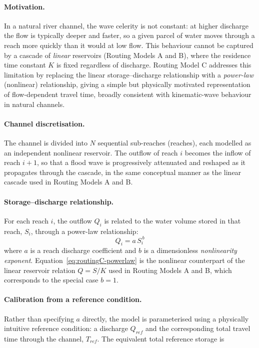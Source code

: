 \documentclass[a4paper, 12pt]{report}
\begin{document}
	\paragraph{Motivation.}
	In a natural river channel, the wave celerity is not constant: at higher discharge the flow is
	typically deeper and faster, so a given parcel of water moves through a reach more quickly than
	it would at low flow. This behaviour cannot be captured by a cascade of \emph{linear} reservoirs
	(Routing Models A and B), where the residence time constant $K$ is fixed regardless of discharge.
	Routing Model C addresses this limitation by replacing the linear storage--discharge relationship
	with a \emph{power-law} (nonlinear) relationship, giving a simple but physically motivated
	representation of flow-dependent travel time, broadly consistent with kinematic-wave behaviour in
	natural channels.

	\paragraph{Channel discretisation.}
	The channel is divided into $N$ sequential sub-reaches (reaches), each modelled as an independent
	nonlinear reservoir. The outflow of reach $i$ becomes the inflow of reach $i+1$, so that a flood
	wave is progressively attenuated and reshaped as it propagates through the cascade, in the same
	conceptual manner as the linear cascade used in Routing Models A and B.

	\paragraph{Storage--discharge relationship.}
	For each reach $i$, the outflow $Q_i$ is related to the water volume stored in that reach,
	$S_i$, through a power-law relationship:
	\begin{equation}
		Q_i = a \, S_i^{\,b}
		\label{eq:routingC-powerlaw}
	\end{equation}
	where $a$ is a reach discharge coefficient and $b$ is a dimensionless \emph{nonlinearity
	exponent}. Equation~\eqref{eq:routingC-powerlaw} is the nonlinear counterpart of the linear
	reservoir relation $Q = S/K$ used in Routing Models A and B, which corresponds to the special
	case $b=1$.

	\paragraph{Calibration from a reference condition.}
	Rather than specifying $a$ directly, the model is parameterised using a physically intuitive
	reference condition: a discharge $Q_{ref}$ and the corresponding total travel time through the
	channel, $T_{ref}$. The equivalent total reference storage is
	
\end{document}
